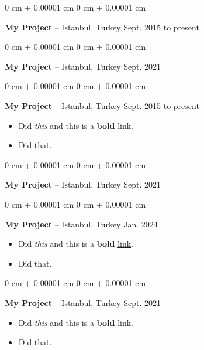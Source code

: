 \documentclass[10pt, letterpaper]{article}
\newenvironment{highlights}{
    \begin{itemize}[
        topsep=0.10 cm,
        parsep=0.10 cm,
        partopsep=0pt,
        itemsep=0pt,
        leftmargin=0 cm + 10pt
    ]
}{
    \end{itemize}
        
    \vspace{-0.20cm}
} %
\newenvironment{onecolentry}{
    \begin{adjustwidth}{
        0 cm + 0.00001 cm
    }{
        0 cm + 0.00001 cm
    }
}{
    \end{adjustwidth}
} %
\begin{document}
        \vspace{0.1 cm}

        \begin{onecolentry}
            \textbf{My Project} -- Istanbul, Turkey \hfill Sept. 2015 to present
        \end{onecolentry}

        \vspace{0.1 cm}

        \begin{onecolentry}
            \textbf{My Project} -- Istanbul, Turkey \hfill Sept. 2021
        \end{onecolentry}

        \vspace{0.1 cm}

        \begin{onecolentry}
            \textbf{My Project} -- Istanbul, Turkey \hfill Sept. 2015 to present
            \begin{highlights}
                \item Did \textit{this} and this is a \textbf{bold} \href{https://example.com}{link}.
                \item Did that.
            \end{highlights}
        \end{onecolentry}

        \vspace{0.1 cm}

        \begin{onecolentry}
            \textbf{My Project} -- Istanbul, Turkey \hfill Sept. 2021
        \end{onecolentry}

        \vspace{0.1 cm}

        \begin{onecolentry}
            \textbf{My Project} -- Istanbul, Turkey \hfill Jan. 2024
            \begin{highlights}
                \item Did \textit{this} and this is a \textbf{bold} \href{https://example.com}{link}.
                \item Did that.
            \end{highlights}
        \end{onecolentry}

        \vspace{0.1 cm}

        \begin{onecolentry}
            \textbf{My Project} -- Istanbul, Turkey \hfill Sept. 2021
            \begin{highlights}
                \item Did \textit{this} and this is a \textbf{bold} \href{https://example.com}{link}.
                \item Did that.
            \end{highlights}
        \end{onecolentry}
\end{document}
